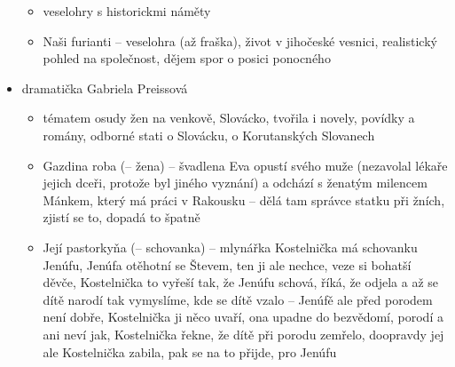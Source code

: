 \documentclass{article}
\begin{document}
\begin{itemize}
\begin{itemize}
    \item veselohry s historickmi náměty
    \item Naši furianti -- veselohra (až fraška), život v jihočeské vesnici, realistický pohled na společnost, dějem spor o posici ponocného
  \end{itemize}
  \item dramatička Gabriela Preissová
  \begin{itemize}
    \item tématem osudy žen na venkově, Slovácko, tvořila i novely, povídky a romány, odborné stati o Slovácku, o Korutanských Slovanech
    \item Gazdina roba (-- žena) -- švadlena Eva opustí svého muže (nezavolal lékaře jejich dceři, protože byl jiného vyznání) a odchází s ženatým milencem Mánkem, který má práci v Rakousku -- dělá tam správce statku při žních, zjistí se to, dopadá to špatně
    \item Její pastorkyňa (-- schovanka) -- mlynářka Kostelnička má schovanku Jenúfu, Jenúfa otěhotní se Števem, ten ji ale nechce, veze si bohatší děvče, Kostelnička to vyřeší tak, že Jenúfu schová, říká, že odjela a až se dítě narodí tak vymyslíme, kde se dítě vzalo -- Jenúfě ale před porodem není dobře, Kostelnička ji něco uvaří, ona upadne do bezvědomí, porodí a ani neví jak, Kostelnička řekne, že dítě při porodu zemřelo, doopravdy jej ale Kostelnička zabila, pak se na to přijde, pro Jenúfu
  \end{itemize}
\end{itemize}
\end{document}
